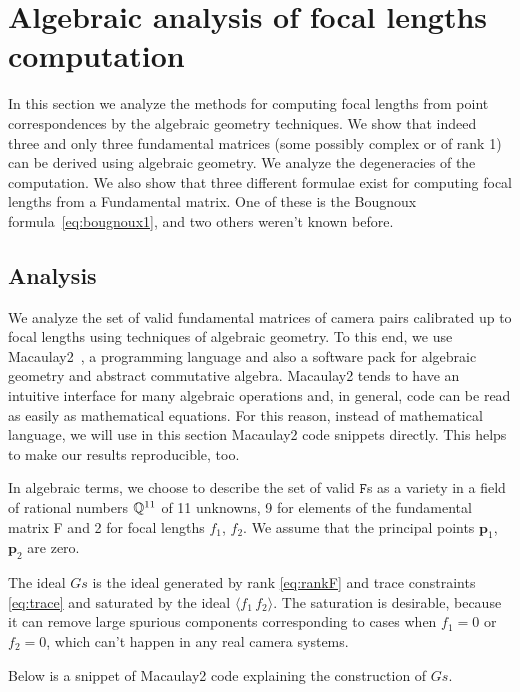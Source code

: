
\chapter{ Algebraic analysis of focal lengths computation}

\label{seq:algeom}

In this section we analyze the methods for computing focal lengths from point correspondences by the algebraic geometry techniques. We show that indeed three and only three fundamental matrices (some possibly complex or of rank 1) can be derived using algebraic geometry. We analyze the degeneracies of the computation. We also show that three different formulae exist for computing focal lengths from a Fundamental matrix. One of these is the Bougnoux formula~\ref{eq:bougnoux1}, and two others weren't known before.

\section{Analysis}
We analyze the set of valid fundamental matrices of  camera pairs  calibrated up to focal lengths using techniques of algebraic geometry. To this end, we use Macaulay2~\cite{Macaulay}, a programming language and also a software pack for algebraic geometry and abstract commutative algebra. Macaulay2 tends to have an intuitive interface for many algebraic operations and, in general, code can be read as easily as mathematical equations. For this reason, instead of mathematical language, we will use in this section Macaulay2 code snippets directly. This helps to make our results reproducible, too.


In algebraic terms, we choose to describe the set of valid $\mathtt{F}$s as a variety in a field of rational numbers $\mathbb{Q}^{11}$ of 11 unknowns, 9 for elements of the fundamental matrix F and 2 for focal lengths $f_1$, $f_2$. We assume that the principal points $\mathbf{p}_1$, $\mathbf{p}_2$ are zero.  

The ideal $Gs$ is the ideal generated by rank \ref{eq:rankF} and trace constraints \ref{eq:trace} and saturated by the ideal $\langle f_1\,f_2 \rangle$. The saturation is desirable, because it can remove large spurious components corresponding to cases when $f_1=0$ or $f_2=0$, which can't happen in any real camera systems.

Below is a snippet of Macaulay2 code explaining the construction of  $Gs$.

